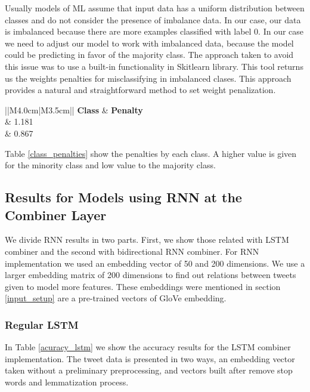 \documentclass[12pt]{report}
\begin{document}
Usually models of \ac{ML} assume that input data has a uniform distribution between classes and do not consider the presence of imbalance data. In our case, our data is imbalanced because there are more examples classified with label 0. In our case we need to adjust our model to work with imbalanced data, because the model could be predicting in favor of the majority class. The approach taken to avoid this issue was to use a built-in functionality in Skitlearn library. This tool returns us the weights penalties for misclassifying in imbalanced clases. This approach provides a natural and straightforward method to set weight penalization.

\begin{table}[H]
	\centering
	\begin{tabular}{||M{4.0cm}|M{3.5cm}||}
		\hline
		\textbf{Class} 	& \textbf{Penalty}		\\         	& 1.181          		\\  & 0.867     \\ \hline	
	\end{tabular}
	\caption{Triplets distribution}\label{class_penalties}
\end{table}

Table \ref{class_penalties} show the penalties by each class. A higher value is given for the minority class and low value to the majority class.

\subsection{Results for Models using RNN at the Combiner Layer}
We divide \ac{RNN} results in two parts. First, we show those  related with \ac{LSTM} combiner and the second with bidirectional \ac{RNN} combiner. 
For RNN implementation we used an embedding vector of 50 and 200 dimensions. We use a larger embedding matrix of 200 dimensions to find out relations between tweets given to model more features. These embeddings were mentioned in section \ref{input_setup} are a pre-trained vectors of GloVe embedding.

\subsubsection{Regular LSTM}
In Table \ref{acuracy_lstm} we show the accuracy results for the \ac{LSTM}  combiner implementation. The tweet data is presented in two ways, an embedding vector taken without a preliminary preprocessing, and vectors built after remove stop words and lemmatization process.
\end{document}
